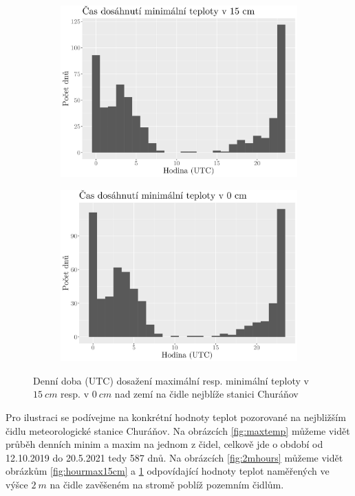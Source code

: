 \begin{figure}
\begin{subfigure}{0.45\textwidth}
  \includegraphics[width=\textwidth]{img/hist_hourmin15cm.png}
		\caption{}
		\label{fig:hourmin15cm}
	\end{subfigure}
	\hfill
	\begin{subfigure}{0.45\textwidth}
  \includegraphics[width=\textwidth]{img/hist_hourmin0cm.png}
		\caption{}
		\label{fig:hourmin0cm}
	\end{subfigure}
	\caption{Denní doba (UTC) dosažení maximální resp. minimální teploty v $\SI{15}{cm}$ resp. v $\SI{0}{cm}$ nad zemí na čidle nejblíže stanici Churáňov}
	\label{fig:hours}
\end{figure}

Pro ilustraci se podívejme na konkrétní hodnoty teplot pozorované na nejbližším čidlu meteorologické stanice Churáňov. Na obrázcích \ref{fig:maxtemp} můžeme vidět průběh denních minim a maxim na jednom z čidel, celkově jde o období od 12.10.2019 do 20.5.2021 tedy 587 dnů. Na obrázcích \ref{fig:2mhours} můžeme vidět obrázkům \ref{fig:hourmax15cm} a \ref{fig:hourmin15cm} odpovídající hodnoty teplot naměřených ve výšce $\SI{2}{m}$ na čidle zavěšeném na stromě poblíž pozemním čidlům.

